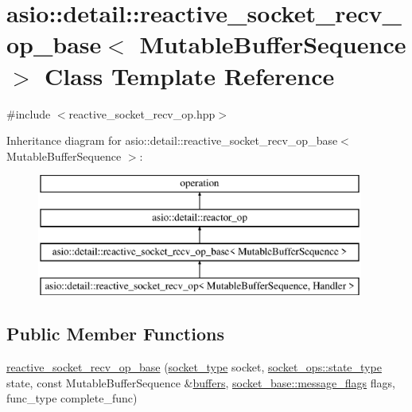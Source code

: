 \hypertarget{classasio_1_1detail_1_1reactive__socket__recv__op__base}{}\section{asio\+:\+:detail\+:\+:reactive\+\_\+socket\+\_\+recv\+\_\+op\+\_\+base$<$ Mutable\+Buffer\+Sequence $>$ Class Template Reference}
\label{classasio_1_1detail_1_1reactive__socket__recv__op__base}


{\ttfamily \#include $<$reactive\+\_\+socket\+\_\+recv\+\_\+op.\+hpp$>$}

Inheritance diagram for asio\+:\+:detail\+:\+:reactive\+\_\+socket\+\_\+recv\+\_\+op\+\_\+base$<$ Mutable\+Buffer\+Sequence $>$\+:\begin{figure}[H]
\begin{center}
\leavevmode
\includegraphics[height=4.000000cm]{classasio_1_1detail_1_1reactive__socket__recv__op__base}
\end{center}
\end{figure}
\subsection*{Public Member Functions}
\begin{DoxyCompactItemize}
\item 
\hyperlink{classasio_1_1detail_1_1reactive__socket__recv__op__base_a0c34653eaf19bd85a38551d2b854c72a}{reactive\+\_\+socket\+\_\+recv\+\_\+op\+\_\+base} (\hyperlink{namespaceasio_1_1detail_a6798c771dd84b79798b1a08150706ea9}{socket\+\_\+type} socket, \hyperlink{namespaceasio_1_1detail_1_1socket__ops_a5ce32ee297edef8833113ea35a933054}{socket\+\_\+ops\+::state\+\_\+type} state, const Mutable\+Buffer\+Sequence \&\hyperlink{group__async__read_ga54dede45c3175148a77fe6635222c47d}{buffers}, \hyperlink{classasio_1_1socket__base_ac3cf77465dfedfe1979b5415cf32cc94}{socket\+\_\+base\+::message\+\_\+flags} flags, func\+\_\+type complete\+\_\+func)
\end{DoxyCompactItemize}
